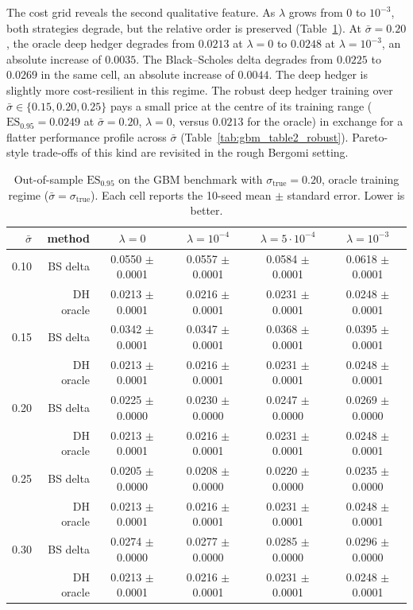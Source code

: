 \documentclass[12pt,a4paper]{article}
\theoremstyle{definition}
\theoremstyle{plain}
\theoremstyle{remark}
\theoremstyle{plain}
\begin{document}
The cost grid reveals the second qualitative feature. As $\lambda$ grows
from $0$ to $10^{-3}$, both strategies degrade, but the relative
order is preserved (Table~\ref{tab:gbm_table2_oracle}). At
$\bar\sigma = 0.20$, the oracle deep hedger degrades from $0.0213$ at
$\lambda = 0$ to $0.0248$ at $\lambda = 10^{-3}$, an absolute increase
of $0.0035$. The Black--Scholes delta degrades from $0.0225$ to $0.0269$
in the same cell, an absolute increase of $0.0044$. The deep hedger is
slightly more cost-resilient in this regime. The robust deep hedger
training over $\bar\sigma \in \{0.15, 0.20, 0.25\}$ pays a small price
at the centre of its training range ($\mathrm{ES}_{0.95} = 0.0249$ at
$\bar\sigma = 0.20$, $\lambda = 0$, versus $0.0213$ for the oracle) in
exchange for a flatter performance profile across $\bar\sigma$
(Table~\ref{tab:gbm_table2_robust}). Pareto-style trade-offs of this
kind are revisited in the rough Bergomi setting.

\begin{table}[H]
\centering
\caption{Out-of-sample $\mathrm{ES}_{0.95}$ on the GBM benchmark with
$\sigma_{\mathrm{true}} = 0.20$, oracle training regime
($\bar\sigma = \sigma_{\mathrm{true}}$). Each cell reports the 10-seed
mean $\pm$ standard error. Lower is better.}
\label{tab:gbm_table2_oracle}
\begin{tabular}{r r c c c c}
\toprule
$\bar\sigma$ & method & $\lambda = 0$ & $\lambda = 10^{-4}$ & $\lambda = 5{\cdot}10^{-4}$ & $\lambda = 10^{-3}$ \\
\midrule
0.10 & BS delta  & 0.0550 $\pm$ 0.0001 & 0.0557 $\pm$ 0.0001 & 0.0584 $\pm$ 0.0001 & 0.0618 $\pm$ 0.0001 \\
     & DH oracle & 0.0213 $\pm$ 0.0001 & 0.0216 $\pm$ 0.0001 & 0.0231 $\pm$ 0.0001 & 0.0248 $\pm$ 0.0001 \\
\midrule
0.15 & BS delta  & 0.0342 $\pm$ 0.0001 & 0.0347 $\pm$ 0.0001 & 0.0368 $\pm$ 0.0001 & 0.0395 $\pm$ 0.0001 \\
     & DH oracle & 0.0213 $\pm$ 0.0001 & 0.0216 $\pm$ 0.0001 & 0.0231 $\pm$ 0.0001 & 0.0248 $\pm$ 0.0001 \\
\midrule
0.20 & BS delta  & 0.0225 $\pm$ 0.0000 & 0.0230 $\pm$ 0.0000 & 0.0247 $\pm$ 0.0000 & 0.0269 $\pm$ 0.0000 \\
     & DH oracle & 0.0213 $\pm$ 0.0001 & 0.0216 $\pm$ 0.0001 & 0.0231 $\pm$ 0.0001 & 0.0248 $\pm$ 0.0001 \\
\midrule
0.25 & BS delta  & 0.0205 $\pm$ 0.0000 & 0.0208 $\pm$ 0.0000 & 0.0220 $\pm$ 0.0000 & 0.0235 $\pm$ 0.0000 \\
     & DH oracle & 0.0213 $\pm$ 0.0001 & 0.0216 $\pm$ 0.0001 & 0.0231 $\pm$ 0.0001 & 0.0248 $\pm$ 0.0001 \\
\midrule
0.30 & BS delta  & 0.0274 $\pm$ 0.0000 & 0.0277 $\pm$ 0.0000 & 0.0285 $\pm$ 0.0000 & 0.0296 $\pm$ 0.0000 \\
     & DH oracle & 0.0213 $\pm$ 0.0001 & 0.0216 $\pm$ 0.0001 & 0.0231 $\pm$ 0.0001 & 0.0248 $\pm$ 0.0001 \\
\bottomrule
\end{tabular}
\end{table}
\end{document}
